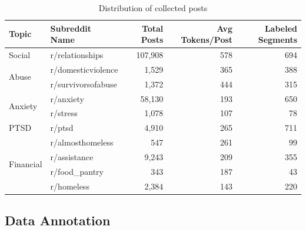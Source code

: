 \documentclass[10pt, a4paper]{article}
\begin{document}
\begin{table}
    \caption{Distribution of collected posts}
    \label{tab:dataset-distribution}
    \begin{center}
        \begin{tabular}{|l|l|r|r|r|}
            \hline
            \textbf{Topic} & \textbf{Subreddit Name} & \textbf{Total Posts} & \textbf{Avg Tokens/Post} & \textbf{Labeled Segments}\\
            \hline
            Social                     & r/relationships    & 107,908 & 578 & 694 \\ \hline
            \multirow{2}{*}{Abuse}     & r/domesticviolence & 1,529   & 365 & 388 \\
                                       & r/survivorsofabuse & 1,372   & 444 & 315 \\ \hline
            \multirow{2}{*}{Anxiety}   & r/anxiety          & 58,130  & 193 & 650 \\
                                       & r/stress           & 1,078   & 107 & 78  \\ \hline
            PTSD                       & r/ptsd             & 4,910   & 265 & 711 \\ \hline
            \multirow{4}{*}{Financial} & r/almosthomeless   & 547     & 261 & 99  \\
                                       & r/assistance       & 9,243   & 209 & 355 \\
                                       & r/food\_pantry     & 343     & 187 & 43  \\
                                       & r/homeless         & 2,384   & 143 & 220 \\ \hline
        \end{tabular}
    \end{center}
\end{table}


\hfill \break
\hfill \break
\subsection{Data Annotation}
\end{document}
